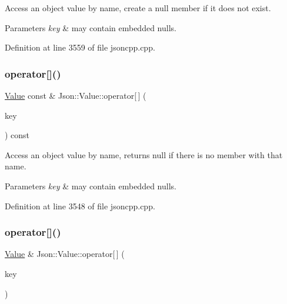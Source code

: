 Access an object value by name, create a null member if it does not exist. 
\begin{DoxyParams}{Parameters}
{\em key} & may contain embedded nulls. \\
\hline
\end{DoxyParams}


Definition at line 3559 of file jsoncpp.\+cpp.

\hypertarget{class_json_1_1_value_aba60f69dcd85e935aa85e7a517e03427}{}\label{class_json_1_1_value_aba60f69dcd85e935aa85e7a517e03427} 
\subsubsection{\texorpdfstring{operator[]()}{operator[]()}\hspace{0.1cm}{\footnotesize\ttfamily [17/18]}}
{\footnotesize\ttfamily \hyperlink{class_json_1_1_value}{Value} const  \& Json\+::\+Value\+::operator\mbox{[}$\,$\mbox{]} (\begin{DoxyParamCaption}\item[{const \hyperlink{config_8h_a1e723f95759de062585bc4a8fd3fa4be}{J\+S\+O\+N\+C\+P\+P\+\_\+\+S\+T\+R\+I\+NG} \&}]{key }\end{DoxyParamCaption}) const}

Access an object value by name, returns null if there is no member with that name. 
\begin{DoxyParams}{Parameters}
{\em key} & may contain embedded nulls. \\
\hline
\end{DoxyParams}


Definition at line 3548 of file jsoncpp.\+cpp.

\hypertarget{class_json_1_1_value_ac3763d7d315ca65dc188e273722f7955}{}\label{class_json_1_1_value_ac3763d7d315ca65dc188e273722f7955} 
\subsubsection{\texorpdfstring{operator[]()}{operator[]()}\hspace{0.1cm}{\footnotesize\ttfamily [18/18]}}
{\footnotesize\ttfamily \hyperlink{class_json_1_1_value}{Value} \& Json\+::\+Value\+::operator\mbox{[}$\,$\mbox{]} (\begin{DoxyParamCaption}\item[{const \hyperlink{class_json_1_1_static_string}{Static\+String} \&}]{key }\end{DoxyParamCaption})}



